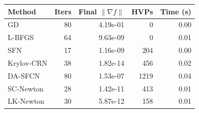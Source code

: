 \begin{tabular}{@{}lrrrr@{}}
\toprule
Method & Iters & Final $\|\nabla f\|$ & HVPs & Time (s) \\
\midrule
GD & 80 & 4.19e-01 & 0 & 0.00 \\
L-BFGS & 64 & 9.63e-09 & 0 & 0.01 \\
SFN & 17 & 1.16e-09 & 204 & 0.00 \\
Krylov-CRN & 38 & 1.82e-14 & 456 & 0.02 \\
DA-SFCN & 80 & 1.53e-07 & 1219 & 0.04 \\
SC-Newton & 28 & 1.42e-11 & 413 & 0.01 \\
LK-Newton & 30 & 5.87e-12 & 158 & 0.01 \\
\bottomrule
\end{tabular}
